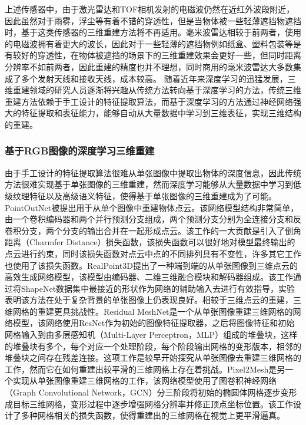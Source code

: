 上述传感器中，由于激光雷达和TOF相机发射的电磁波仍然在近红外波段附近，因此虽然对于雨雾，浮尘等有着不错的穿透性，但是当物体被一些轻薄遮挡物遮挡时，基于这类传感器的三维重建方法将不再适用。毫米波雷达相较于前两者，使用的电磁波拥有着更大的波长，因此对于一些轻薄的遮挡物例如纸盒、塑料包装等是有较好的穿透性，在物体被遮挡的场景下的三维重建效果会更好一些，但同时距离分辨率不如前两者，因此重建的精度也并不理想，同时商用的毫米波雷达大多数集成了多个发射天线和接收天线，成本较高。
随着近年来深度学习的迅猛发展，三维重建领域的研究人员逐渐将兴趣从传统方法转向基于深度学习的方法，传统三维重建方法依赖于手工设计的特征提取算法，而基于深度学习的方法通过神经网络强大的特征提取和表征能力，能够自动从大量数据中学习到三维表征，实现三维结构的重建。
\subsubsection{基于RGB图像的深度学习三维重建}
由于手工设计的特征提取算法很难从单张图像中提取出物体的深度信息，因此传统方法很难实现基于单张图像的三维重建，然而深度学习能够从大量数据中学习到低级纹理特征以及高级语义特征，使得基于单张图像的三维重建成为了可能。PointOutNet\cite{fan2017point}被提出用于从单个图像中重建物体点云。该网络模型结构非常简单，由一个卷积编码器和两个并行预测分支组成，两个预测分支分别为全连接分支和反卷积分支，两个分支的输出合并在一起形成点云。该工作的一大贡献是引入了倒角距离（Charmfer Distance）损失函数，该损失函数可以很好地对模型最终输出的点云进行约束，同时该损失函数对点云中点的不同排列具有不变性，许多其它工作也使用了该损失函数\cite{yu2021pointr, wang2018pixel2mesh}。RealPoint3D\cite{zhang2019realpoint3d}提出了一种端到端的从单张图像到三维点云的高效生成网络模型，该模型由编码器、二维三维融合模块和解码器组成。该工作通过将ShapeNet数据集\cite{chang2015shapenet}中最接近的形状作为网络的辅助输入去进行有效指导，实验表明该方法在处于复杂背景的单张图像上仍表现良好。相较于三维点云的重建，三维网格的重建更具挑战性。Residual MeshNet\cite{pan2018residual}是一个从单张图像重建三维网格的网络模型，该网络使用ResNet\cite{he2016deep}作为初始的图像特征提取器，之后将图像特征和初始网格输入到由多层感知机（Multi-Layer Perceptron，MLP）组成的堆叠块，这样的堆叠块有多个，每个对应一个处理阶段，每个阶段输出网格的变形版本，相邻的堆叠块之间存在残差连接。这项工作是较早开始探究从单张图像去重建三维网格的工作，然而它在如何重建出较平滑的三维网格上存在着挑战。Pixel2Mesh\cite{wang2018pixel2mesh}是另一个实现从单张图像重建三维网格的工作，该网络模型使用了图卷积神经网络（Graph Convolutional Network，GCN）分三阶段将初始的椭圆体网格逐步变形成目标三维网格，变形过程中逐步增强网格分辨率并修正顶点坐标位置。该工作设计了多种网格相关的损失函数，使得重建出的三维网格在视觉上更平滑逼真。

